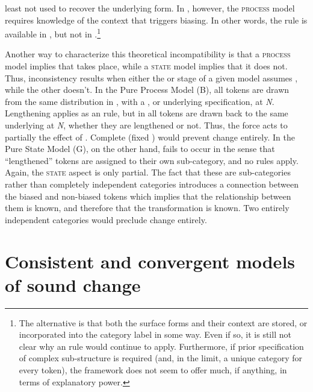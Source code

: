 least not used to recover the underlying form. In , however,
the \textsc{process} model requires knowledge of the context that
triggers biasing. In other words, the  rule is available
in , but not in .\footnote{The alternative is that both the  surface forms and their
 context are stored, or incorporated into the category label
in some way. Even if so, it is still not clear why an  rule
would continue to apply. Furthermore, if prior specification of complex
sub-structure is required (and, in the limit, a unique category for
every token), the  framework does not seem to offer much, if
anything, in terms of explanatory power. }

Another way to characterize this theoretical incompatibility is that
a \textsc{process} model implies that  takes place, while
a \textsc{state} model implies that it does not. Thus, inconsistency
results when either the  or  stage of a given
model assumes , while the other doesn't. In the Pure
Process Model (B), all tokens are drawn from the same distribution
in , with a , or underlying specification, at \emph{N}.
Lengthening applies as an  rule, but in  all tokens
are drawn back to the same underlying  at \emph{N}, whether
they are lengthened or not. Thus, the  force acts to partially
 the effect of . Complete  (fixed
) would prevent change entirely. In the Pure State Model (G),
on the other hand,  fails to occur in the sense that
``lengthened'' tokens are assigned to their own sub-category, and no
 rules apply. Again, the \textsc{state} aspect is only partial.
The fact that these are sub-categories rather than completely independent
categories introduces a connection between the biased and non-biased
tokens which implies that the relationship between them is known,
and therefore that the  transformation is known. Two entirely
independent categories would preclude change entirely. 

\section{\label{sec:Model-Behavior}Consistent and convergent models of sound change}

